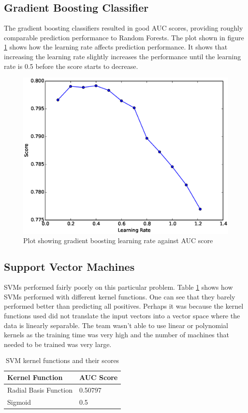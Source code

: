 \documentclass[a4paper, 11pt, twocolumn]{report}
\begin{document}
\subsection{Gradient Boosting Classifier}
The gradient boosting classifiers resulted in good AUC scores, providing roughly comparable prediction performance to Random Forests. The plot shown in figure \ref{fig:gbperf} shows how the learning rate affects prediction performance. It shows that increasing the learning rate slightly increases the performance until the learning rate is 0.5 before the score starts to decrease.

\begin{figure}[h]
    \center
    \includegraphics[width=\linewidth]{img/gbperf}
    \caption{Plot showing gradient boosting learning rate against AUC score}
    \label{fig:gbperf}
\end{figure}

\subsection{Support Vector Machines}
SVMs performed fairly poorly on this particular problem. Table \ref{tab:svm} shows how SVMs performed with different kernel functions. One can see that they barely performed better than predicting all positives. Perhaps it was because the kernel functions used did not translate the input vectors into a vector space where the data is linearly separable. The team wasn't able to use linear or polynomial kernels as the training time was very high and the number of machines that needed to be trained was very large.
\begin{table}[h]
    \center
    \begin{tabular}{| l | l |}
        \hline
        Kernel Function & AUC Score \\ \hline
        Radial Basis Function & 0.50797 \\ \hline
        Sigmoid & 0.5 \\ \hline
    \end{tabular}
    \caption{SVM kernel functions and their scores}
    \label{tab:svm}
\end{table}
\end{document}
